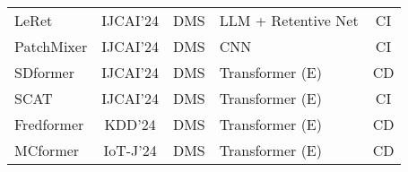 \documentclass[a4paper,oneside,bibliography=totoc]{scrbook}
\begin{document}
{\begin{longtable}{@{}
    >{\raggedright}p{5.5cm}
    c
    c
    >{\centering\arraybackslash}p{2.8cm}
    c}
        LeRet \cite{huang_leret_2024} & IJCAI'24 & DMS & LLM + Retentive Net  & CI\\
        PatchMixer \cite{gong_patchmixer_2024} & IJCAI'24 & DMS  & CNN & CI\\
        SDformer \cite{zhou_sdformer_2024} & IJCAI'24 & DMS & Transformer (E) & CD\\
        SCAT \cite{zhou_scat_2024} & IJCAI'24 & DMS & Transformer (E) & CI\\
        Fredformer \cite{piao_fredformer_2024}     & KDD'24     & DMS  & Transformer (E) & CD\\
        MCformer \cite{han_mcformer_2024} & IoT-J'24 & DMS & Transformer (E) & CD \\
   
    
\end{longtable}
} %
\end{document}
